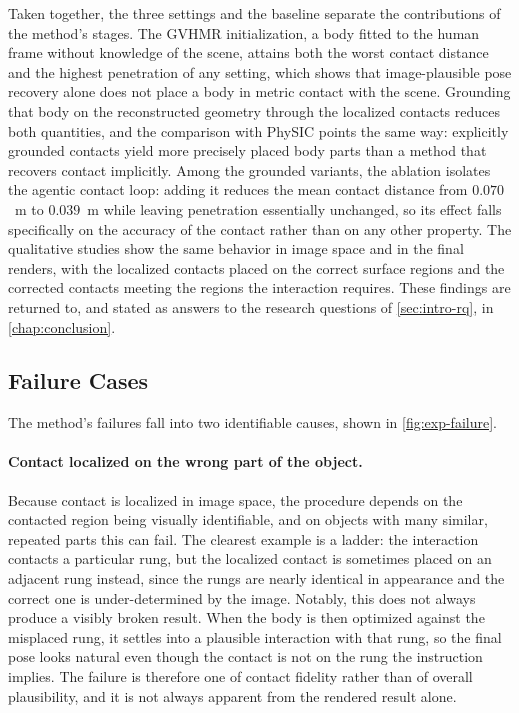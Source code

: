 Taken together, the three settings and the baseline separate the contributions of the method's stages. The GVHMR initialization, a body fitted to the human frame without knowledge of the scene, attains both the worst contact distance and the highest penetration of any setting, which shows that image-plausible pose recovery alone does not place a body in metric contact with the scene. Grounding that body on the reconstructed geometry through the localized contacts reduces both quantities, and the comparison with PhySIC points the same way: explicitly grounded contacts yield more precisely placed body parts than a method that recovers contact implicitly. Among the grounded variants, the ablation isolates the agentic contact loop: adding it reduces the mean contact distance from $0.070$~m to $0.039$~m while leaving penetration essentially unchanged, so its effect falls specifically on the accuracy of the contact rather than on any other property. The qualitative studies show the same behavior in image space and in the final renders, with the localized contacts placed on the correct surface regions and the corrected contacts meeting the regions the interaction requires. These findings are returned to, and stated as answers to the research questions of \cref{sec:intro-rq}, in \cref{chap:conclusion}.

\subsection{Failure Cases}
\label{sec:exp-failure-cases}

The method's failures fall into two identifiable causes, shown in \cref{fig:exp-failure}.

\paragraph{Contact localized on the wrong part of the object.} Because contact is localized in image space, the procedure depends on the contacted region being visually identifiable, and on objects with many similar, repeated parts this can fail. The clearest example is a ladder: the interaction contacts a particular rung, but the localized contact is sometimes placed on an adjacent rung instead, since the rungs are nearly identical in appearance and the correct one is under-determined by the image. Notably, this does not always produce a visibly broken result. When the body is then optimized against the misplaced rung, it settles into a plausible interaction with that rung, so the final pose looks natural even though the contact is not on the rung the instruction implies. The failure is therefore one of contact fidelity rather than of overall plausibility, and it is not always apparent from the rendered result alone.

